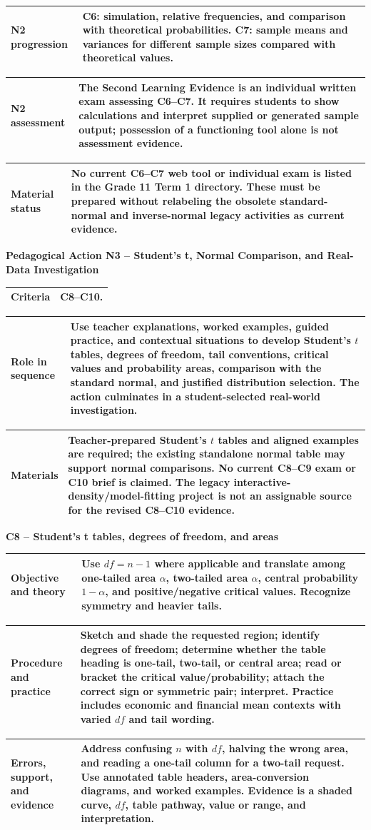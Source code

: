 \documentclass[10pt,letterpaper]{article}
\newcommand{\plansubsection}[1]{%
	\Needspace{7\baselineskip}\par\vspace{6pt}%
	\begin{tcolorbox}[
		colback=sectionblue!13,
		colframe=borderblue,
		boxrule=1.15pt,
		sharp corners,
		left=6pt,right=6pt,top=4pt,bottom=4pt,
		before skip=0pt,after skip=0pt]
		\bfseries #1
	\end{tcolorbox}%
}
\newcommand{\criterionpart}[1]{%
	\Needspace{10\baselineskip}\par\vspace{5pt}%
	\begin{tcolorbox}[
		colback=sectionblue!7,
		colframe=borderblue,
		boxrule=0.8pt,
		sharp corners,
		left=6pt,right=6pt,top=3pt,bottom=3pt,
		before skip=0pt,after skip=2pt]
		\bfseries #1
	\end{tcolorbox}%
}
\newcommand{\labelled}[2]{%
	\noindent
	\begin{tabularx}{\textwidth}{|>{\RaggedRight\arraybackslash\bfseries}p{2.12in}|>{\RaggedRight\arraybackslash}X|}
		\hline
		#1 & #2\\
		\hline
	\end{tabularx}\par\vspace{-\arrayrulewidth}%
}
\begin{document}
\labelled{N2 progression}{C6: simulation, relative frequencies, and comparison with theoretical probabilities. C7: sample means and variances for different sample sizes compared with theoretical values.}
\labelled{N2 assessment}{The Second Learning Evidence is an individual written exam assessing C6--C7. It requires students to show calculations and interpret supplied or generated sample output; possession of a functioning tool alone is not assessment evidence.}
\labelled{Material status}{No current C6--C7 web tool or individual exam is listed in the Grade 11 Term 1 directory. These must be prepared without relabeling the obsolete standard-normal and inverse-normal legacy activities as current evidence.}

\plansubsection{Pedagogical Action N3 -- Student's t, Normal Comparison, and Real-Data Investigation}
\labelled{Criteria}{C8--C10.}
\labelled{Role in sequence}{Use teacher explanations, worked examples, guided practice, and contextual situations to develop Student's $t$ tables, degrees of freedom, tail conventions, critical values and probability areas, comparison with the standard normal, and justified distribution selection. The action culminates in a student-selected real-world investigation.}
\labelled{Materials}{Teacher-prepared Student's $t$ tables and aligned examples are required; the existing standalone normal table may support normal comparisons. No current C8--C9 exam or C10 brief is claimed. The legacy interactive-density/model-fitting project is not an assignable source for the revised C8--C10 evidence.}

\criterionpart{C8 -- Student's t tables, degrees of freedom, and areas}
\labelled{Objective and theory}{Use $df=n-1$ where applicable and translate among one-tailed area $\alpha$, two-tailed area $\alpha$, central probability $1-\alpha$, and positive/negative critical values. Recognize symmetry and heavier tails.}
\labelled{Procedure and practice}{Sketch and shade the requested region; identify degrees of freedom; determine whether the table heading is one-tail, two-tail, or central area; read or bracket the critical value/probability; attach the correct sign or symmetric pair; interpret. Practice includes economic and financial mean contexts with varied $df$ and tail wording.}
\labelled{Errors, support, and evidence}{Address confusing $n$ with $df$, halving the wrong area, and reading a one-tail column for a two-tail request. Use annotated table headers, area-conversion diagrams, and worked examples. Evidence is a shaded curve, $df$, table pathway, value or range, and interpretation.}
\end{document}

